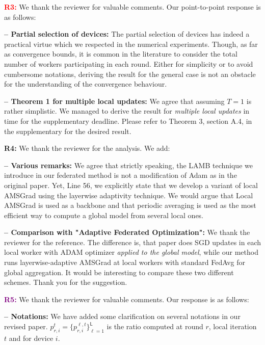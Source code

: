 \documentclass{article}
\begin{document}
\textbf{\textcolor{red}{R3:}} We thank the reviewer for valuable comments.  Our point-to-point response is as follows: \vspace{-3pt}

\textbf{-- Partial selection of devices:} The partial selection of devices has indeed a practical virtue which we respected in the numerical experiments.
Though, as far as convergence bounds, it is common in the literature to consider the total number of workers participating in each round.
Either for simplicity or to avoid cumbersome notations, deriving the result for the general case is not an obstacle for the understanding of the convergence behaviour.

\vspace{-2pt}
\textbf{-- Theorem 1 for multiple local updates:} 
We agree that assuming $T =1$ is rather simplistic.
We managed to derive the result for \emph{multiple local updates} in time for the supplementary deadline.
Please refer to Theorem 3, section A.4, in the supplementary for the desired result.
 

\textbf{\textcolor{green!50!black}{R4:}} We thank the reviewer for the analysis. We add: \vspace{-3pt}

\textbf{-- Various remarks:}
We agree that strictly speaking, the LAMB technique we introduce in our federated method is not a modification of Adam as in the original paper.
Yet, Line 56, we explicitly state that we develop a variant of local AMSGrad using the layerwise adaptivity technique.
We would argue that Local AMSGrad is used as a backbone and that periodic averaging is used as the most efficient way to compute a global model from several local ones.

\vspace{-2pt}
\textbf{-- Comparison with "Adaptive Federated Optimization":} 
We thank the reviewer for the reference.
The difference is, that paper does SGD updates in each local worker with ADAM optimizer \emph{applied to the global model}, while our method runs layerwise-adaptive AMSGrad at local workers with standard FedAvg for global aggregation.
It would be interesting to compare these two different schemes. 
Thank you for the suggestion.


\textbf{\textcolor{purple}{R5:}} We thank the reviewer for valuable comments. Our response is as follows: \vspace{-3pt}

\textbf{-- Notations:} We have added some clarification on several notations in our revised paper. 
$p_{r,i}^{t} = \{p_{r,i}^{\ell,t}\}_{\ell=1}^{\mathsf{L}}$ is the ratio computed at round $r$, local iteration $t$ and for device $i$.
\end{document}
